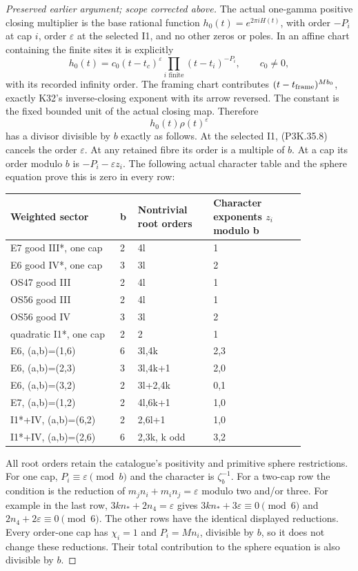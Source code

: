 \begin{proof}[Preserved earlier argument; scope corrected above]
The actual one-gamma positive closing multiplier is the base
rational function \(h_0(t)=e^{2\pi iH(t)}\), with order
\(-P_i\) at cap \(i\), order \(\varepsilon\) at the
selected I1, and no other zeros or poles.
In an affine chart containing the finite sites it is explicitly
\[
 h_0(t)=c_0(t-t_c)^\varepsilon
                   \prod_{i\text{ finite}}(t-t_i)^{-P_i},
 \qquad c_0\ne0,
\]
with its recorded infinity order. The framing chart contributes
\((t-t_{\rm frame})^{Mb_0}\), exactly K32's inverse-closing
exponent with its arrow reversed. The constant is the fixed
bounded unit of the actual closing map. Therefore
\[
                h_0(t)\rho(t)^\varepsilon
\]
has a divisor divisible by \(b\) exactly as follows. At the
selected I1, (P3K.35.8) cancels the order \(\varepsilon\).
At any retained fibre its order is a multiple of \(b\).
At a cap its order modulo \(b\) is
\(-P_i-\varepsilon z_i\). The following actual character
table and the sphere equation prove this is zero in every row:

\begin{center}\small\begin{tabular}{p{0.32\linewidth}p{0.04\linewidth}p{0.22\linewidth}p{0.27\linewidth}}\toprule
Weighted sector & b & Nontrivial root orders & Character exponents \(z_i\) modulo b\\
\midrule
E7 good III*, one cap & 2 & 4l & 1\\
E6 good IV*, one cap & 3 & 3l & 2\\
OS47 good III & 2 & 4l & 1\\
OS56 good III & 2 & 4l & 1\\
OS56 good IV & 3 & 3l & 2\\
quadratic I1*, one cap & 2 & 2 & 1\\
E6, (a,b)=(1,6) & 6 & 3l,4k & 2,3\\
E6, (a,b)=(2,3) & 3 & 3l,4k+1 & 2,0\\
E6, (a,b)=(3,2) & 2 & 3l+2,4k & 0,1\\
E7, (a,b)=(1,2) & 2 & 4l,6k+1 & 1,0\\
I1*+IV, (a,b)=(6,2) & 2 & 2,6l+1 & 1,0\\
I1*+IV, (a,b)=(2,6) & 6 & 2,3k, k odd & 3,2\\
\bottomrule\end{tabular}\end{center}

All root orders retain the catalogue's positivity and primitive
sphere restrictions. For one cap, \(P_i\equiv\varepsilon\pmod b\)
and the character is \(\zeta_b^{-1}\). For a two-cap row
the condition is the reduction of
\(m_jn_i+m_in_j=\varepsilon\) modulo two and/or three.
For example in the last row, \(3kn_*+2n_4=\varepsilon\)
gives \(3kn_*+3\varepsilon\equiv0\pmod6\) and
\(2n_4+2\varepsilon\equiv0\pmod6\). The other rows have
the identical displayed reductions. Every order-one cap has
\(\chi_i=1\) and \(P_i=Mn_i\), divisible by \(b\), so it
does not change these reductions. Their total contribution to
the sphere equation is also divisible by \(b\).


\end{proof}
